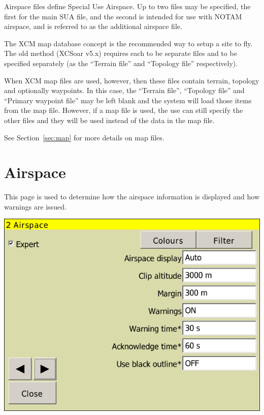 \documentclass[a4paper,12pt]{refrep}
\begin{document}
Airspace files define Special Use Airspace.  Up to two files may be
specified, the first for the main SUA file, and the second is intended
for use with NOTAM airspace, and is referred to as the additional
airspace file.

The XCM map database concept is the recommended way to setup a site to fly.
The old method (XCSoar v5.x) requires each to be separate files and to be
specified separately (as the ``Terrain file'' and ``Topology file'' respectively).  

When XCM map files are used, however, then these files contain terrain, topology
and optionally waypoints.  In this case, the ``Terrain file'', ``Topology file'' and 
``Primary waypoint file'' may be left blank and the system will load those items
from the map file. However, if a map file is used, the use can still specify the other
files and they will be used instead of the data in the map file.

See Section~\ref{sec:map} for more details on map files.


\clearpage
\section{Airspace}

This page is used to determine how the airspace information is
displayed and how warnings are issued.

\begin{center}
\includegraphics[angle=0,width=\linewidth,keepaspectratio='true']{figures/config-airspace.png}
\end{center}
\end{document}
